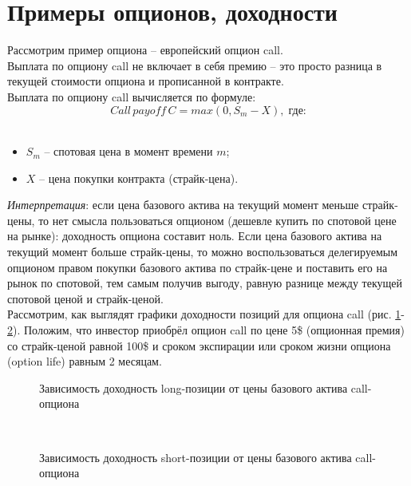 \documentclass{article}
\begin{document}
\section{Примеры опционов, доходности}
Рассмотрим пример опциона -- европейский опцион call.\\
Выплата по опциону call не включает в себя премию -- это просто разница в текущей стоимости опциона и прописанной в контракте.\\
Выплата по опциону call вычисляется по формуле:
\[Call\,payoff \,C = max(0, S_m - X),\;\text{где:}\]\\
\begin{itemize}
    \item \(S_m\) -- спотовая цена в момент времени \(m\);
    \item \(X\) -- цена покупки контракта (страйк-цена).
\end{itemize}
\textit{Интерпретация}: если цена базового актива на текущий момент меньше страйк-цены, то нет смысла пользоваться опционом (дешевле купить по спотовой цене на рынке): доходность опциона составит ноль. Если цена базового актива на текущий момент больше страйк-цены, то можно воспользоваться делегируемым опционом правом покупки базового актива по страйк-цене и поставить его на рынок по спотовой, тем самым получив выгоду, равную разнице между текущей спотовой ценой и страйк-ценой.\\
Рассмотрим, как выглядят графики доходности позиций для опциона call (рис. \ref{pic1_long_call_price}-\ref{pic2_short_call_price}). Положим, что инвестор приобрёл опцион call по цене 5\$ (опционная премия) со страйк-ценой равной 100\$ и сроком экспирации или сроком жизни опциона (option life) равным 2 месяцам.\\
\begin{figure}[h]
    \caption{Зависимость доходность long-позиции от цены базового актива call-опциона}
    \label{pic1_long_call_price}
\end{figure}\\
\begin{figure}[h]
    \caption{Зависимость доходность short-позиции от цены базового актива call-опциона}
    \label{pic2_short_call_price}
\end{figure}\\
\end{document}
